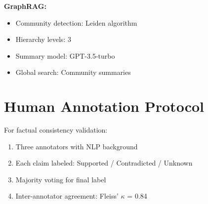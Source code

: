 \documentclass[conference]{IEEEtran}
\begin{document}
\textbf{GraphRAG:}
\begin{itemize}
    \item Community detection: Leiden algorithm
    \item Hierarchy levels: 3
    \item Summary model: GPT-3.5-turbo
    \item Global search: Community summaries
\end{itemize}

\section{Human Annotation Protocol}
\label{app:annotation}

For factual consistency validation:
\begin{enumerate}
    \item Three annotators with NLP background
    \item Each claim labeled: Supported / Contradicted / Unknown
    \item Majority voting for final label
    \item Inter-annotator agreement: Fleiss' $\kappa$ = 0.84
\end{enumerate}
\end{document}
